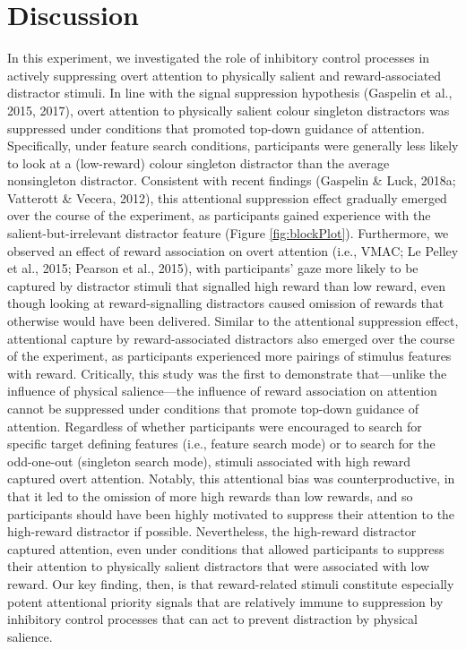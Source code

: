\documentclass[man, a4paper, noextraspace, 11pt,floatsintext]{apa6}
\theoremstyle{definition}
\theoremstyle{definition}
\theoremstyle{definition}
\theoremstyle{remark}
\begin{document}
\section{Discussion}\label{discussion}

In this experiment, we investigated the role of inhibitory control
processes in actively suppressing overt attention to physically salient
and reward-associated distractor stimuli. In line with the signal
suppression hypothesis (Gaspelin et al., 2015, 2017), overt attention to
physically salient colour singleton distractors was suppressed under
conditions that promoted top-down guidance of attention. Specifically,
under feature search conditions, participants were generally less likely
to look at a (low-reward) colour singleton distractor than the average
nonsingleton distractor. Consistent with recent findings (Gaspelin \&
Luck, 2018a; Vatterott \& Vecera, 2012), this attentional suppression
effect gradually emerged over the course of the experiment, as
participants gained experience with the salient-but-irrelevant
distractor feature (Figure \ref{fig:blockPlot}). Furthermore, we
observed an effect of reward association on overt attention (i.e., VMAC;
Le Pelley et al., 2015; Pearson et al., 2015), with participants' gaze
more likely to be captured by distractor stimuli that signalled high
reward than low reward, even though looking at reward-signalling
distractors caused omission of rewards that otherwise would have been
delivered. Similar to the attentional suppression effect, attentional
capture by reward-associated distractors also emerged over the course of
the experiment, as participants experienced more pairings of stimulus
features with reward. Critically, this study was the first to
demonstrate that---unlike the influence of physical salience---the
influence of reward association on attention cannot be suppressed under
conditions that promote top-down guidance of attention. Regardless of
whether participants were encouraged to search for specific target
defining features (i.e., feature search mode) or to search for the
odd-one-out (singleton search mode), stimuli associated with high reward
captured overt attention. Notably, this attentional bias was
counterproductive, in that it led to the omission of more high rewards
than low rewards, and so participants should have been highly motivated
to suppress their attention to the high-reward distractor if possible.
Nevertheless, the high-reward distractor captured attention, even under
conditions that allowed participants to suppress their attention to
physically salient distractors that were associated with low reward. Our
key finding, then, is that reward-related stimuli constitute especially
potent attentional priority signals that are relatively immune to
suppression by inhibitory control processes that can act to prevent
distraction by physical salience.
\end{document}
